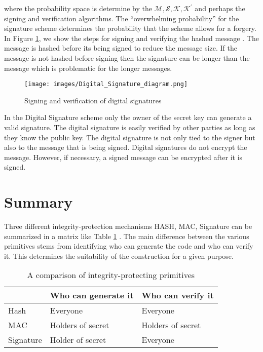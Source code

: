 	where the probability space is determine by the $\mathcal {M, S, K, K^{'}}$ and perhaps the signing and verification algorithms.
	The ``overwhelming probability'' for the signature scheme determines the probability that the scheme allows for a forgery.
	In Figure \ref{fig:digita-signature}, we show the steps for signing and verifying the hashed message \cite{DigitalSignature}. 
	The message is hashed before its being signed to reduce the message size. 
	If the message is not hashed before signing then the signature can be longer than the message which is problematic for the longer messages.
	\begin{figure}[h!]
		\centering
		\texttt{[image: images/Digital\_Signature\_diagram.png]}
		\caption{ Signing and verification of digital signatures}
		\label{fig:digita-signature}
	\end{figure}

	In the Digital Signature scheme only the owner of the secret key can generate a valid signature.
	The digital signature is easily verified by other parties as long as they know the public key.
	The digital signature is not only tied to the signer but also to the message that is being signed.
	Digital signatures do not encrypt the message. However, if necessary, a signed message can be encrypted after it is signed.


\section{Summary}
	Three different integrity-protection mechanisms HASH, MAC, Signature can be summarized in a matrix like Table \ref{table:summary} \cite{2002-Stajano-ubiquitous}.
	The main difference between the various primitives stems from identifying who can generate the code and who can verify it.
	This determines the suitability of the construction for a given purpose.
	\begin{table}[!htb]	
		\begin{center}
			\begin{tabular}{ |l| l| l| }
		    \hline
		     & Who can generate it & Who can verify it \\
		    \hline
		    Hash & Everyone & Everyone \\	
		    \hline
		    MAC & Holders of secret & Holders of secret \\
		    \hline
		    Signature & Holder of secret & Everyone \\
		    \hline
			\end{tabular}
		\end{center}
		\caption{A comparison of integrity-protecting primitives}
	  \label{table:summary}
	\end{table}

